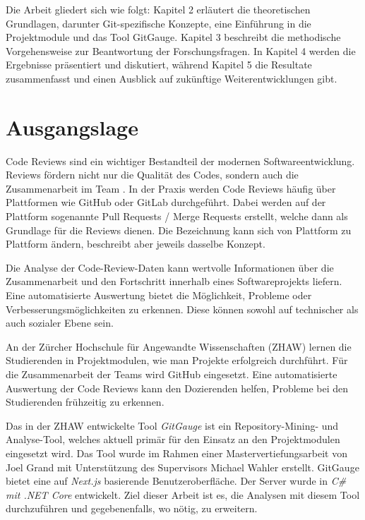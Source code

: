 Die Arbeit gliedert sich wie folgt: Kapitel 2 erläutert die theoretischen Grundlagen, darunter Git-spezifische Konzepte, eine Einführung in die Projektmodule und das Tool GitGauge. Kapitel 3 beschreibt die methodische Vorgehensweise zur Beantwortung der Forschungsfragen. In Kapitel 4 werden die Ergebnisse präsentiert und diskutiert, während Kapitel 5 die Resultate zusammenfasst und einen Ausblick auf zukünftige Weiterentwicklungen gibt.

\label{Chapter1} %


\section{Ausgangslage}
\label{sec:Ausgangslage} 
Code Reviews sind ein wichtiger Bestandteil der modernen Softwareentwicklung. Reviews fördern nicht nur die Qualität des Codes, sondern auch die Zusammenarbeit im Team \parencite{dos_santos_investigating_2018}. In der Praxis werden Code Reviews häufig über Plattformen wie GitHub oder GitLab durchgeführt. Dabei werden auf der Plattform sogenannte Pull Requests / Merge Requests erstellt, welche dann als Grundlage für die Reviews dienen. Die Bezeichnung kann sich von Plattform zu Plattform ändern, beschreibt aber jeweils dasselbe Konzept. \parencite{kansab_analyzing_2025}


Die Analyse der Code-Review-Daten kann wertvolle Informationen über die Zusammenarbeit und den Fortschritt innerhalb eines Softwareprojekts liefern. Eine automatisierte Auswertung bietet die Möglichkeit, Probleme oder Verbesserungsmöglichkeiten zu erkennen. Diese können sowohl auf technischer als auch sozialer Ebene sein. 

An der Zürcher Hochschule für Angewandte Wissenschaften (ZHAW) lernen die Studierenden in Projektmodulen, wie man Projekte erfolgreich durchführt. Für die Zusammenarbeit der Teams wird GitHub eingesetzt. Eine automatisierte Auswertung der Code Reviews kann den Dozierenden helfen, Probleme bei den Studierenden frühzeitig zu erkennen.

Das in der ZHAW entwickelte Tool \textit{GitGauge} ist ein Repository-Mining- und Analyse-Tool, welches aktuell primär für den Einsatz an den Projektmodulen eingesetzt wird. Das Tool wurde im Rahmen einer Mastervertiefungsarbeit von Joel Grand mit Unterstützung des Supervisors Michael Wahler erstellt. GitGauge bietet eine auf \textit{Next.js} basierende Benutzeroberfläche. Der Server wurde in \textit{C\# mit .NET Core } entwickelt. Ziel dieser Arbeit ist es, die Analysen mit diesem Tool durchzuführen und gegebenenfalls, wo nötig, zu erweitern. \parencite{grand_joel_wahler_michael_waspe_lara_stumpf_simon_repo_nodate}

